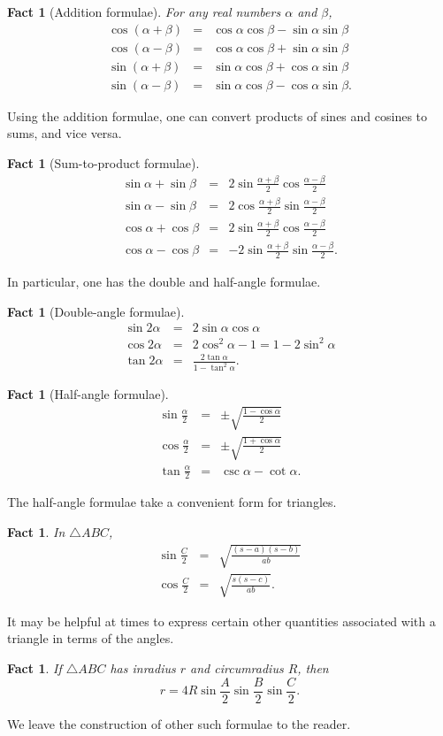 \documentclass[12pt]{book}
\numberwithin{exc}{section}
\numberwithin{figure}{section}
\newtheorem{fact}[theorem]{Fact}
\numberwithin{equation}{theorem}
\def\beqa{\begin{eqnarray*}}
\def\eeqa{\end{eqnarray*}}
\begin{document}
\begin{fact}[Addition formulae] 
For any real numbers $\alpha$ and $\beta$,
\beqa
\cos (\alpha +\beta) &=& \cos \alpha \cos \beta - \sin \alpha \sin \beta \\
\cos (\alpha-\beta) &=& \cos \alpha \cos \beta + \sin \alpha \sin \beta \\
\sin (\alpha+\beta) &=& \sin \alpha \cos \beta + \cos \alpha \sin \beta \\
\sin (\alpha-\beta) &=& \sin \alpha \cos \beta - \cos \alpha \sin \beta.
\eeqa
\end{fact}
Using the addition formulae, one can convert products of sines and 
cosines to sums, and vice versa.
\begin{fact}[Sum-to-product formulae] 
\beqa
\sin \alpha + \sin \beta &=& 2 \sin \frac{\alpha+\beta}{2} \cos \frac{\alpha-\beta}{2} \\
\sin \alpha - \sin \beta &=& 2 \cos \frac{\alpha+\beta}{2} \sin \frac{\alpha-\beta}{2} \\
\cos \alpha + \cos \beta &=& 2 \sin \frac{\alpha+\beta}{2} \cos \frac{\alpha-\beta}{2} \\
\cos \alpha - \cos \beta &=& -2 \sin \frac{\alpha+\beta}{2} \sin \frac{\alpha-\beta}{2}.
\eeqa
\end{fact}
In particular, one has the double and half-angle formulae.
\begin{fact}[Double-angle formulae] 
\beqa
\sin 2\alpha &=& 2 \sin \alpha \cos \alpha \\
\cos 2\alpha &=& 2 \cos^2 \alpha - 1 = 1 - 2 \sin^2 \alpha \\
\tan 2\alpha &=& \frac{2 \tan \alpha}{1 - \tan^2 \alpha}.
\eeqa
\end{fact}
\begin{fact}[Half-angle formulae] 
\beqa
\sin \frac \alpha 2 &=& \pm \sqrt{\frac{1 - \cos \alpha}{2}} \\
\cos \frac \alpha 2 &=& \pm \sqrt{\frac{1 + \cos \alpha}{2}} \\
\tan \frac \alpha 2 &=& \csc \alpha - \cot \alpha.
\eeqa
\end{fact}
The half-angle formulae take a convenient form for triangles.
\begin{fact}
In $\triangle ABC$,
\beqa
\sin \frac C2 &=& \sqrt{\frac{(s-a)(s-b)}{ab}} \\
\cos \frac C2 &=& \sqrt{\frac{s(s-c)}{ab}}.
\eeqa
\end{fact}
It may be helpful at times to express certain other quantities 
associated with a triangle in terms of the angles.
\begin{fact}
If $\triangle ABC$ has inradius $r$ and circumradius $R$, then
\[
r = 4R \sin \frac{A}{2} \sin \frac{B}{2} \sin \frac{C}{2}.
\]
\end{fact}
We leave the construction of other such formulae to the reader.
\end{document}
